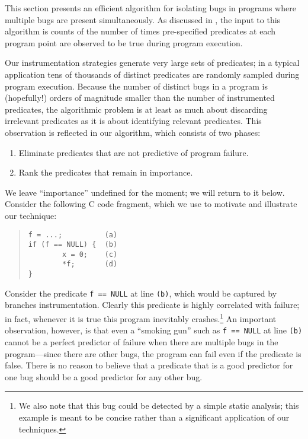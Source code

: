 This section presents an efficient algorithm for
isolating bugs in programs where multiple bugs are present
simultaneously.  As discussed in , the
input to this algorithm is counts of the number of times pre-specified
predicates at each program point are observed to be true during program
execution.

Our instrumentation strategies generate very large sets
of predicates; in a typical application tens of thousands of distinct
predicates are randomly sampled during program execution.  Because the
number of distinct bugs in a program is (hopefully!) orders of
magnitude smaller than the number of instrumented predicates, the
algorithmic problem is at least as much about discarding irrelevant
predicates as it is about identifying relevant predicates.  This
observation is reflected in our algorithm, which consists of two phases:
\begin{enumerate}
\item Eliminate predicates that are not predictive of program failure.

\item Rank the predicates that remain in importance.  
\end{enumerate}

We leave ``importance'' undefined for the moment; we will return to it below.
Consider the following C code fragment, which we use to motivate and illustrate
our technique:
\begin{quote}
\begin{verbatim}
f = ...;          (a)
if (f == NULL) {  (b)
        x = 0;    (c)
        *f;       (d)
}
\end{verbatim}
\end{quote}
Consider the predicate {\tt f == NULL} at line {\tt (b)}, which would
be captured by branches instrumentation.  Clearly
this predicate is highly correlated with failure; in fact, whenever it
is true this program inevitably crashes.\footnote{We also note that this bug could 
be detected by a simple static analysis; this example is meant to be concise rather than 
a significant application of our techniques.}   An important observation,
however, is that even a ``smoking gun'' such as {\tt f == NULL} at
line {\tt (b)} cannot be a perfect predictor of failure when there are
multiple bugs in the program---since there are other bugs, the program can fail
even if the predicate is false.  There is no reason to believe that
a predicate that is a good predictor for one bug should be a good predictor 
for any other bug.

